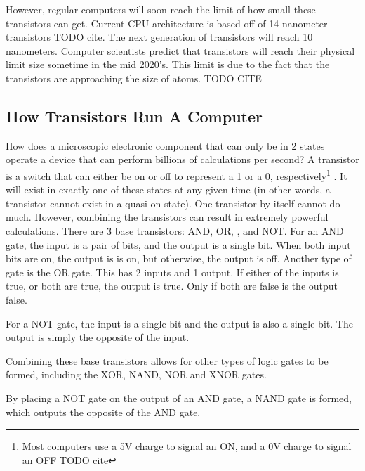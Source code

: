 \documentclass[10pt,journal,compsoc]{IEEEtran}
\begin{document}
However, regular computers will soon reach the limit of how small these transistors can get. Current CPU architecture is based off of 14 nanometer transistors TODO cite. The next generation of transistors will reach 10 nanometers. Computer scientists predict that transistors will reach their physical limit size sometime in the mid 2020's. This limit is due to the fact that the transistors are approaching the size of atoms. TODO CITE

\subsection{How Transistors Run A Computer}
How does a microscopic electronic component that can only be in 2 states operate a device that can perform billions of calculations per second? A transistor is a switch that can either be on or off to represent a 1 or a 0, respectively\footnote{Most computers use a 5V charge to signal an ON, and a 0V charge to signal an OFF TODO cite
	}
. It will exist in exactly one of these states at any given time (in other words, a transistor cannot exist in a quasi-on state). One transistor by itself cannot do much. However, combining the transistors can result in extremely powerful calculations. There are 3 base transistors: AND, OR, , and NOT.  For an AND gate, the input is a pair of bits, and the output is a single bit. When both input bits are on, the output is is on, but otherwise, the output is off. Another type of gate is the OR gate. This has 2 inputs and 1 output. If either of the inputs is true, or both are true, the output is true. Only if both are false is the output false. 

For a NOT gate, the input is a single bit and the output is also a single bit. The output is simply the opposite of the input. 

Combining these base transistors allows for other types of logic gates to be formed, including the XOR, NAND, NOR and XNOR gates.

 By placing a NOT gate on the output of an AND gate, a NAND gate is formed, which outputs the opposite of the AND gate. 
\end{document}
